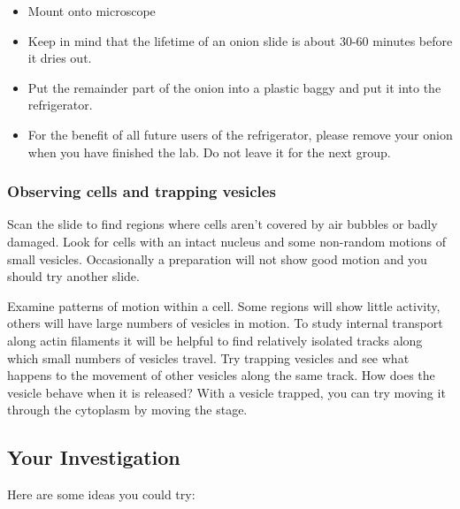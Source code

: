 \documentclass{../lab}
\begin{document}
\begin{itemize}
    \item Mount onto microscope

    \item Keep in mind that the lifetime of an onion slide is about 30-60 minutes before it dries out.

    \item Put the remainder part of the onion into a plastic baggy and put it into the refrigerator.

    \item For the benefit of all future users of the refrigerator, please remove your onion when you have finished the lab. Do not leave it for the next group.

\end{itemize}

\subsubsection{Observing cells and trapping vesicles}

Scan the slide to find regions where cells aren't covered by air bubbles or badly damaged. Look for cells with an intact nucleus and some non-random motions of small vesicles. Occasionally a preparation will not show good motion and you should try another slide.

Examine patterns of motion within a cell. Some regions will show little activity, others will have large numbers of vesicles in motion. To study internal transport along actin filaments it will be helpful to find relatively isolated tracks along which small numbers of vesicles travel. Try trapping vesicles and see what happens to the movement of other vesicles along the same track. How does the vesicle behave when it is released? With a vesicle trapped, you can try moving it through the cytoplasm by moving the stage.

\subsection{Your Investigation}

Here are some ideas you could try:
\end{document}
